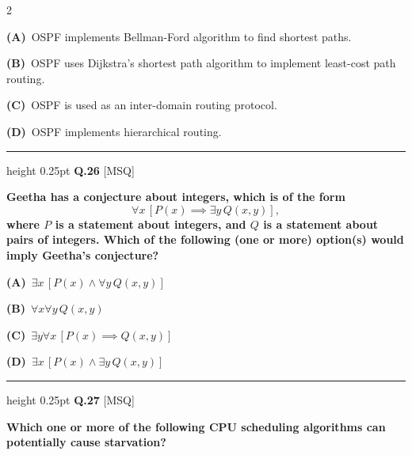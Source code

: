 \documentclass[a4paper,10pt,twoside]{article}
\begin{document}
\begin{multicols}{2}
\par\vspace{2pt}\noindent
\textbf{(A)}~OSPF implements Bellman-Ford algorithm to find shortest paths.\par\vspace{2pt}\noindent
\textbf{(B)}~OSPF uses Dijkstra's shortest path algorithm to implement least-cost path routing.\par\vspace{2pt}\noindent
\textbf{(C)}~OSPF is used as an inter-domain routing protocol.\par\vspace{2pt}\noindent
\textbf{(D)}~OSPF implements hierarchical routing.
\par\vspace{6pt}\hrule height 0.25pt\vspace{6pt}
\noindent\textbf{Q.26} \hfill {\footnotesize\textsf{[MSQ]}}
\par\vspace{2pt}
{\bfseries Geetha has a conjecture about integers, which is of the form
\[ \forall x \, [P(x) \implies \exists y \, Q(x, y)], \]
where $P$ is a statement about integers, and $Q$ is a statement about pairs of integers. Which of the following (one or more) option(s) would imply Geetha's conjecture? \par}
\par\vspace{2pt}\noindent
\textbf{(A)}~$\exists x \, [P(x) \land \forall y \, Q(x, y)]$\par\vspace{2pt}\noindent
\textbf{(B)}~$\forall x \forall y \, Q(x, y)$\par\vspace{2pt}\noindent
\textbf{(C)}~$\exists y \forall x \, [P(x) \implies Q(x, y)]$\par\vspace{2pt}\noindent
\textbf{(D)}~$\exists x \, [P(x) \land \exists y \, Q(x, y)]$
\par\vspace{6pt}\hrule height 0.25pt\vspace{6pt}
\noindent\textbf{Q.27} \hfill {\footnotesize\textsf{[MSQ]}}
\par\vspace{2pt}
{\bfseries Which one or more of the following CPU scheduling algorithms can potentially cause starvation? \par}
\par\vspace{2pt}\noindent

\end{multicols}
\end{document}
